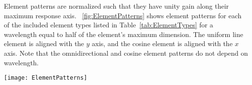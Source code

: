 Element patterns are normalized such that they have unity gain along their maximum response axis. \figurename~\ref{fig:ElementPatterns} shows element patterns for each of the included element types listed in Table~\ref{tab:ElementTypes} for a wavelength equal to half of the element's maximum dimension. The uniform line element is aligned with the $y$ axis, and the cosine element is aligned with the $x$ axis. Note that the omnidirectional and cosine element patterns do not depend on wavelength.

\begin{sidewaysfigure}[!ht]
\begin{center}
\texttt{[image: ElementPatterns]}
\caption{\label{fig:ElementPatterns}Element patterns for included element types (magnitude in dB)}
\end{center}
\end{sidewaysfigure}
